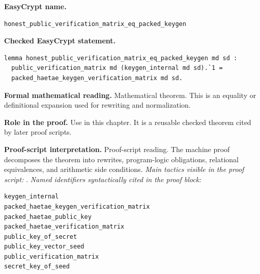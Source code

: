 \begin{formaltheorem}
\noindent\textbf{EasyCrypt name.}
\begin{lstlisting}[language=EasyCrypt,basicstyle=\ttfamily\scriptsize]
honest_public_verification_matrix_eq_packed_keygen
\end{lstlisting}
\noindent\textbf{Checked EasyCrypt statement.}
\begin{lstlisting}[language=EasyCrypt,basicstyle=\ttfamily\scriptsize]
lemma honest_public_verification_matrix_eq_packed_keygen md sd :
  public_verification_matrix md (keygen_internal md sd).`1 =
  packed_haetae_keygen_verification_matrix md sd.
\end{lstlisting}
\noindent\textbf{Formal mathematical reading.}
Mathematical theorem. This is an equality or definitional expansion used for rewriting and normalization.

\noindent\textbf{Role in the proof.}
Use in this chapter. It is a reusable checked theorem cited by later proof scripts.

\noindent\textbf{Proof-script interpretation.}
Proof-script reading. The machine proof decomposes the theorem into rewrites, program-logic obligations, relational equivalences, and arithmetic side conditions.
\emph{Main tactics visible in the proof script:} .
\emph{Named identifiers syntactically cited in the proof block:}
\begin{lstlisting}[language=EasyCrypt,basicstyle=\ttfamily\scriptsize]
keygen_internal
packed_haetae_keygen_verification_matrix
packed_haetae_public_key
packed_haetae_verification_matrix
public_key_of_secret
public_key_vector_seed
public_verification_matrix
secret_key_of_seed
\end{lstlisting}

\end{formaltheorem}

